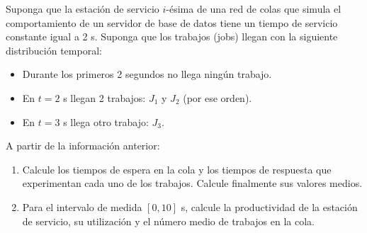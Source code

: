 \begin{ejercicio}\label{ej:5.32}
    Suponga que la estación de servicio $i$-ésima de una red de colas que simula el comportamiento de un servidor de base de datos tiene un tiempo de servicio constante igual a 2 s. Suponga que los trabajos (jobs) llegan con la siguiente distribución temporal:
    \begin{itemize}
        \item Durante los primeros 2 segundos no llega ningún trabajo.
        \item En $t = 2$ s llegan 2 trabajos: $J_1$ y $J_2$ (por ese orden).
        \item En $t = 3$ s llega otro trabajo: $J_3$.
    \end{itemize}
    A partir de la información anterior:
    \begin{enumerate}
        \item Calcule los tiempos de espera en la cola y los tiempos de respuesta que experimentan cada uno de los trabajos. Calcule finalmente sus valores medios.
        \item Para el intervalo de medida $[0, 10]$ s, calcule la productividad de la estación de servicio, su utilización y el número medio de trabajos en la cola.
    \end{enumerate}
\end{ejercicio}
\begin{comment}
\solucion
    \begin{enumerate}
        \item Los tiempos de espera en la cola son: $W_i(J_1) = 0$ s, $W_i(J_2) = 2$ s, $W_i(J_3) = 3$ s. El tiempo medio de espera es $W_i = \frac{5}{3} = 1.67$ s. Los tiempos de respuesta son: $R_i(J_1) = 2$ s, $R_i(J_2) = 4$ s, $R_i(J_3) = 5$ s. El tiempo medio de respuesta es $R_i = \frac{11}{3} = 3.67$ s.
        \item La productividad de la estación de servicio es $X_i = 0.3$ trabajos/s, su utilización es $U_i = 0.6$ (60\%) y el número medio de trabajos en la cola es $Q_i = 0.5$ trabajos.
    \end{enumerate}
\end{comment}

